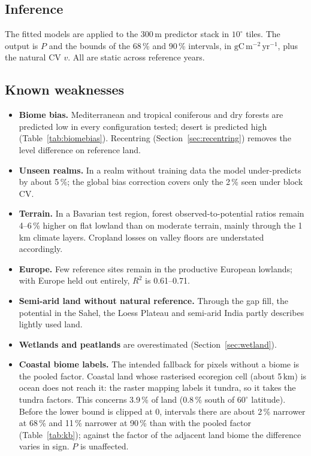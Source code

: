 \documentclass[11pt,a4paper]{article}
\newcommand{\npp}{\ensuremath{\mathrm{gC\,m^{-2}\,yr^{-1}}}}
\begin{document}
\subsection{Inference}

The fitted models are applied to the 300\,m predictor stack in $10^\circ$ tiles. The output is
$P$ and the bounds of the 68\,\% and 90\,\% intervals, in \npp, plus the natural CV $v$. All are
static across reference years.

\subsection{Known weaknesses}
\label{sec:potential-limits}

\begin{itemize}
\item \textbf{Biome bias.} Mediterranean and tropical coniferous and dry forests are predicted
low in every configuration tested; desert is predicted high (Table~\ref{tab:biomebias}).
Recentring (Section~\ref{sec:recentring}) removes the level difference on reference land.
\item \textbf{Unseen realms.} In a realm without training data the model under-predicts by
about 5\,\%; the global bias correction covers only the 2\,\% seen under block CV.
\item \textbf{Terrain.} In a Bavarian test region, forest observed-to-potential ratios remain
4--6\,\% higher on flat lowland than on moderate terrain, mainly through the 1\,km climate
layers. Cropland losses on valley floors are understated accordingly.
\item \textbf{Europe.} Few reference sites remain in the productive European lowlands; with
Europe held out entirely, $R^2$ is 0.61--0.71.
\item \textbf{Semi-arid land without natural reference.} Through the gap fill, the potential in
the Sahel, the Loess Plateau and semi-arid India partly describes lightly used land.
\item \textbf{Wetlands and peatlands} are overestimated (Section~\ref{sec:wetland}).
\item \textbf{Coastal biome labels.} The intended fallback for pixels without a biome is the
pooled factor. Coastal land whose rasterised ecoregion cell (about 5\,km) is ocean does not reach
it: the raster mapping labels it tundra, so it takes the tundra factors. This concerns 3.9\,\% of
land (0.8\,\% south of $60^\circ$ latitude). Before the lower bound is clipped at 0, intervals there
are about 2\,\% narrower at 68\,\% and 11\,\% narrower at 90\,\% than with the pooled factor
(Table~\ref{tab:kb}); against the factor of the adjacent land biome the difference varies in sign.
$P$ is unaffected.
\end{itemize}
\end{document}
